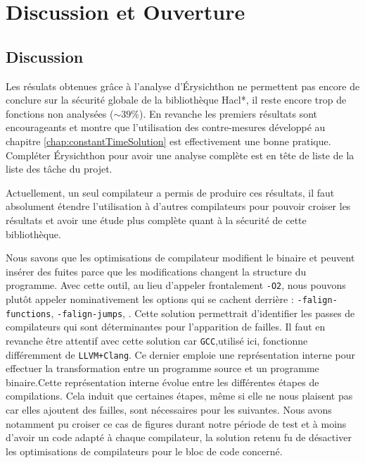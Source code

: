 \chapter*{Discussion et Ouverture}

\section*{Discussion}

Les résulats obtenues grâce à l'analyse d'Érysichthon ne permettent pas encore de conclure sur la sécurité globale de la bibliothèque Hacl*, il reste encore trop de fonctions non analysées ($\sim 39\%$). En revanche les premiers résultats sont encourageants et montre que l'utilisation des contre-mesures développé au chapitre \ref{chap:constantTimeSolution} est effectivement une bonne pratique. Compléter Érysichthon pour avoir une analyse complète est en tête de liste de la liste des tâche du projet.\medbreak

Actuellement, un seul compilateur a permis de produire ces résultats, il faut absolument étendre l'utilisation à d'autres compilateurs pour pouvoir croiser les résultats et avoir une étude plus complète quant à la sécurité de cette bibliothèque.\smallbreak

Nous savons que les optimisations de compilateur modifient le binaire et peuvent insérer des fuites parce que les modifications changent la structure du programme. Avec cette outil, au lieu d'appeler frontalement \texttt{-O2}, nous pouvons plutôt appeler nominativement les options qui se cachent derrière : \texttt{-falign-functions}, \texttt{-falign-jumps}, \etc. Cette solution permettrait d'identifier les passes de compilateurs qui sont déterminantes pour l'apparition de failles. Il faut en revanche être attentif avec cette solution car \texttt{GCC},utilisé ici, fonctionne différemment de \texttt{LLVM+Clang}. Ce dernier emploie une représentation interne pour effectuer la transformation entre un programme source et un programme binaire.Cette représentation interne évolue entre les différentes étapes de compilations. Cela induit que certaines étapes, même si elle ne nous plaisent pas car elles ajoutent des failles, sont nécessaires pour les suivantes. Nous avons notamment pu croiser ce cas de figures durant notre période de test et à moins d'avoir un code adapté à chaque compilateur, la solution retenu fu de désactiver les optimisations de compilateurs pour le bloc de code concerné.\medbreak

